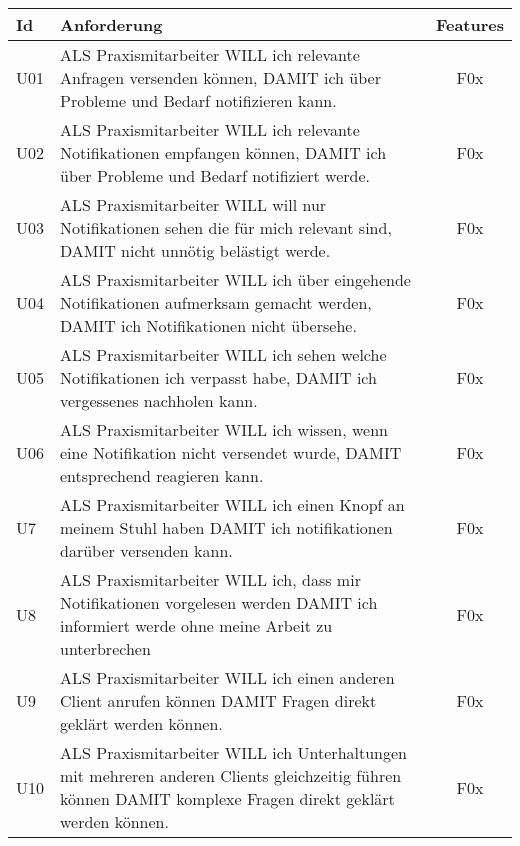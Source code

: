 \begin{table}[h]
    \centering
    \begin{tabular}{|l|p{13cm}|c|}
        \hline
        \textbf{Id} & \textbf{Anforderung}                                                                                                                                      & \textbf{Features} \\
        \hline
        U01         & ALS Praxismitarbeiter WILL ich relevante Anfragen versenden können, DAMIT ich über Probleme und Bedarf notifizieren kann. & F0x \\
        \hline
        U02         & ALS Praxismitarbeiter WILL ich relevante Notifikationen empfangen können, DAMIT ich über Probleme und Bedarf notifiziert werde. & F0x \\
        \hline
        U03         & ALS Praxismitarbeiter WILL will nur Notifikationen sehen die für mich relevant sind, DAMIT nicht unnötig belästigt werde. & F0x \\
        \hline
        U04         & ALS Praxismitarbeiter WILL ich über eingehende Notifikationen aufmerksam gemacht werden, DAMIT ich Notifikationen nicht übersehe. & F0x \\
        \hline
        U05         & ALS Praxismitarbeiter WILL ich sehen welche Notifikationen ich verpasst habe, DAMIT ich vergessenes nachholen kann. & F0x \\
        \hline
        U06         & ALS Praxismitarbeiter WILL ich wissen, wenn eine Notifikation nicht versendet wurde, DAMIT entsprechend reagieren kann. & F0x \\
        \hline
        U7          & ALS Praxismitarbeiter WILL ich einen Knopf an meinem Stuhl haben DAMIT ich notifikationen darüber versenden kann. & F0x \\
        \hline
        U8          & ALS Praxismitarbeiter WILL ich, dass mir Notifikationen vorgelesen werden DAMIT ich informiert werde ohne meine Arbeit zu unterbrechen & F0x \\
        \hline
        U9          & ALS Praxismitarbeiter WILL ich einen anderen Client anrufen können DAMIT Fragen direkt geklärt werden können. & F0x \\
        \hline
        U10         & ALS Praxismitarbeiter WILL ich Unterhaltungen mit mehreren anderen Clients gleichzeitig führen können DAMIT komplexe Fragen direkt geklärt werden können. & F0x \\
        \hline
    \end{tabular}\label{tab:userstories1}
\end{table}

